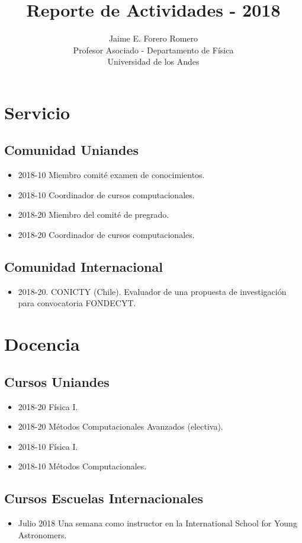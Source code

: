 \documentclass{article}
\title{Reporte de Actividades - 2018}
\author{Jaime E. Forero Romero\\Profesor Asociado - Departamento de
  F\'isica\\Universidad de los Andes}
\begin{document}
\maketitle


\section{Servicio}

\subsection{Comunidad Uniandes}
\begin{itemize}
\item {2018-10} Miembro comit\'e examen de conocimientos.
\item {2018-10} Coordinador de cursos computacionales.
\item {2018-20} Miembro del comit\'e de pregrado.
\item {2018-20} Coordinador de cursos computacionales.
\end{itemize}


\subsection{Comunidad Internacional}

\begin{itemize}
\item 2018-20. CONICTY (Chile). Evaluador de una propuesta de
  investigaci\'on para convocatoria FONDECYT.
\end{itemize}


\section{Docencia}

\subsection{Cursos Uniandes}
\begin{itemize}
\item {2018-20} F\'isica I.
\item {2018-20} M\'etodos Computacionales Avanzados (electiva).
\item {2018-10} F\'isica I.
\item {2018-10} M\'etodos Computacionales.
\end{itemize}

\subsection{Cursos Escuelas Internacionales}
\begin{itemize}
\item {Julio 2018} Una semana como instructor en la International
  School for Young Astronomers.
\end{itemize}
\end{document}
